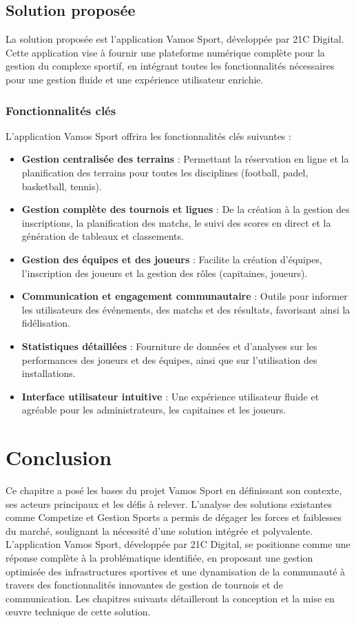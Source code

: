 \documentclass{article}
\begin{document}
\subsection{Solution proposée}

La solution proposée est l'application Vamos Sport, développée par 21C Digital. Cette application vise à fournir une plateforme numérique complète pour la gestion du complexe sportif, en intégrant toutes les fonctionnalités nécessaires pour une gestion fluide et une expérience utilisateur enrichie.

\subsubsection{Fonctionnalités clés}

L'application Vamos Sport offrira les fonctionnalités clés suivantes :
\begin{itemize}
    \item \textbf{Gestion centralisée des terrains} : Permettant la réservation en ligne et la planification des terrains pour toutes les disciplines (football, padel, basketball, tennis).
    \item \textbf{Gestion complète des tournois et ligues} : De la création à la gestion des inscriptions, la planification des matchs, le suivi des scores en direct et la génération de tableaux et classements.
    \item \textbf{Gestion des équipes et des joueurs} : Facilite la création d'équipes, l'inscription des joueurs et la gestion des rôles (capitaines, joueurs).
    \item \textbf{Communication et engagement communautaire} : Outils pour informer les utilisateurs des événements, des matchs et des résultats, favorisant ainsi la fidélisation.
    \item \textbf{Statistiques détaillées} : Fourniture de données et d'analyses sur les performances des joueurs et des équipes, ainsi que sur l'utilisation des installations.
    \item \textbf{Interface utilisateur intuitive} : Une expérience utilisateur fluide et agréable pour les administrateurs, les capitaines et les joueurs.
\end{itemize}

\section{Conclusion}

Ce chapitre a posé les bases du projet Vamos Sport en définissant son contexte, ses acteurs principaux et les défis à relever. L'analyse des solutions existantes comme Competize et Gestion Sports a permis de dégager les forces et faiblesses du marché, soulignant la nécessité d'une solution intégrée et polyvalente. L'application Vamos Sport, développée par 21C Digital, se positionne comme une réponse complète à la problématique identifiée, en proposant une gestion optimisée des infrastructures sportives et une dynamisation de la communauté à travers des fonctionnalités innovantes de gestion de tournois et de communication. Les chapitres suivants détailleront la conception et la mise en œuvre technique de cette solution.
\end{document}
